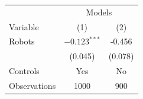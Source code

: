 \begin{tabular}{lcc}
\hline
 & \multicolumn{2}{c}{Models} \\
Variable & (1) & (2) \\
Robots & $-0.123^{***}$ & -0.456 \\
 & (0.045) & (0.078) \\
Controls & Yes & No \\
Observations & 1000 & 900 \\
\hline
\end{tabular}
